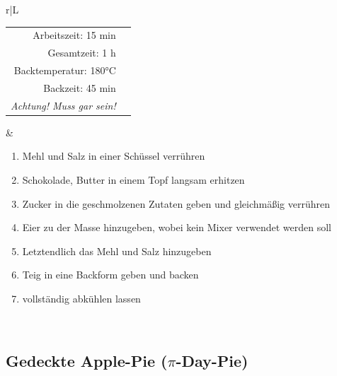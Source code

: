 \documentclass[a4paper, 12pt]{scrbook} 								%
\numberwithin{equation}{section} 									%
\begin{document}
\begin{tabularx}{\textwidth}{r|L}
\begin{tabular}[t]{rr}
				Arbeitszeit: 15 min	\\
				Gesamtzeit:	1 h		\\
				Backtemperatur: 180°C	\\
				Backzeit: 45 min \\
				\emph{Achtung! Muss gar sein!}	\\
			\end{tabular}			&	\begin{enumerate}[nosep]
											\item Mehl und Salz in einer Schüssel verrühren
											\item Schokolade, Butter in einem Topf langsam erhitzen
											\item Zucker in die geschmolzenen Zutaten geben und gleichmäßig verrühren
											\item Eier zu der Masse hinzugeben, wobei kein Mixer verwendet werden soll
											\item Letztendlich das Mehl und Salz hinzugeben
											\item Teig in eine Backform geben und backen
											\item vollständig abkühlen lassen
										\end{enumerate}	\\
		\end{tabularx}
		\newpage


		\subsection{Gedeckte Apple-Pie ($\pi$-Day-Pie)}
\end{document}
